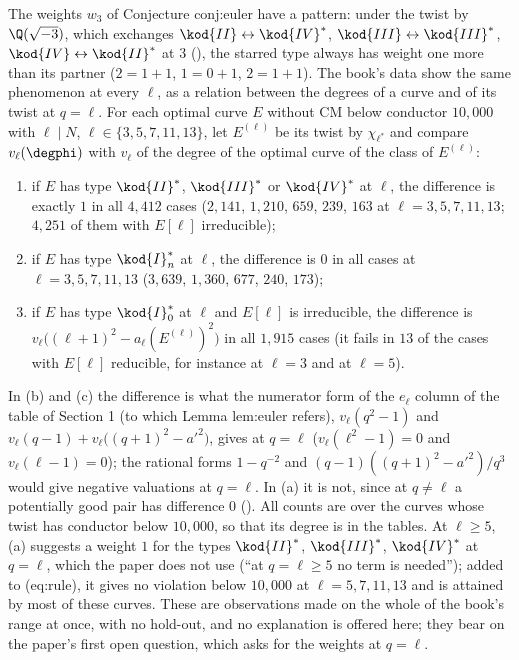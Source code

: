 \begin{sloppypar}
\begin{example}[a twist relation at $q=\ell$, observed]\label{ex:computation:twist-at-ell}
The weights $w_3$ of Conjecture conj:euler have a pattern: under the twist by $\Q(\sqrt{-3})$, which exchanges $\kod{II}\leftrightarrow\kod{IV}^*$,
$\kod{III}\leftrightarrow\kod{III}^*$, $\kod{IV}\leftrightarrow\kod{II}^*$ at $3$ (), the starred type always has weight one more than its partner ($2=1+1$,
$1=0+1$, $2=1+1$). The book's data show the same phenomenon at every $\ell$, as a relation between the degrees of a curve and of its twist at
$q=\ell$. For each optimal curve $E$ without CM below conductor $10{,}000$ with $\ell\mid N$, $\ell\in\{3,5,7,11,13\}$, let $E^{(\ell)}$ be its twist by $\chi_{\ell^*}$ and
compare $v_\ell(\degphi)$ with $v_\ell$ of the degree of the optimal curve of the class of $E^{(\ell)}$:
\begin{enumerate}[label=(\alph*)]
\item if $E$ has type $\kod{II}^*$, $\kod{III}^*$ or $\kod{IV}^*$ at $\ell$, the difference is exactly $1$ in all $4{,}412$ cases ($2{,}141$, $1{,}210$, $659$, $239$, $163$ at
$\ell=3,5,7,11,13$; $4{,}251$ of them with $E[\ell]$ irreducible);
\item if $E$ has type $\kod{I}_n^*$ at $\ell$, the difference is $0$ in all cases at $\ell=3,5,7,11,13$ ($3{,}639$, $1{,}360$, $677$, $240$, $173$);
\item if $E$ has type $\kod{I}_0^*$ at $\ell$ and $E[\ell]$ is irreducible, the difference is $v_\ell\bigl((\ell+1)^2-a_\ell(E^{(\ell)})^2\bigr)$ in all $1{,}915$ cases (it fails in $13$ of
the cases with $E[\ell]$ reducible, for instance  at $\ell=3$ and  at $\ell=5$).
\end{enumerate}
In (b) and (c) the difference is what the numerator form of the $e_\ell$ column of the table of Section 1 (to which Lemma lem:euler refers),
$v_\ell(q^2-1)$ and $v_\ell(q-1)+v_\ell\bigl((q+1)^2-a'^2\bigr)$, gives at $q=\ell$ ($v_\ell(\ell^2-1)=0$ and $v_\ell(\ell-1)=0$); the rational forms
$1-q^{-2}$ and $(q-1)((q+1)^2-a'^2)/q^3$ would give negative valuations at $q=\ell$. In (a) it is not, since at $q\ne\ell$ a potentially good pair has difference $0$
(). All counts are over the curves whose twist has conductor below $10{,}000$, so that its degree is in the tables. At $\ell\ge5$, (a) suggests a
weight $1$ for the types $\kod{II}^*$, $\kod{III}^*$, $\kod{IV}^*$ at $q=\ell$, which the paper does not use (``at $q=\ell\ge5$ no term is needed''); added to (eq:rule), it gives no
violation below $10{,}000$ at $\ell=5,7,11,13$ and is attained by most of these curves. These are observations made on the whole of the book's range at
once, with no hold-out, and no explanation is offered here; they bear on the paper's first open question, which asks for the weights at
$q=\ell$.
\end{example}


\end{sloppypar}
